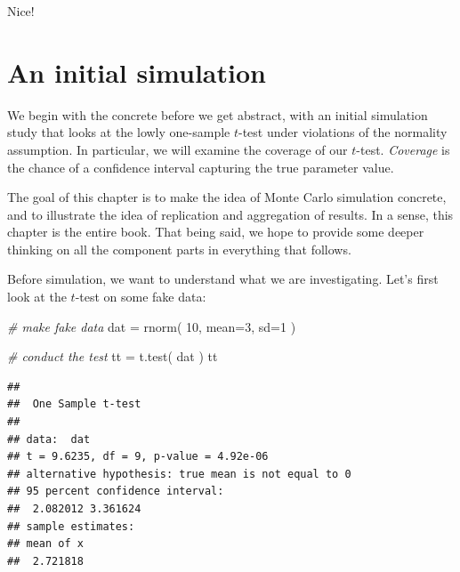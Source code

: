 \documentclass[
]{book}
\newenvironment{Shaded}{\begin{snugshade}}{\end{snugshade}}
\newcommand{\AttributeTok}[1]{\textcolor[rgb]{0.77,0.63,0.00}{#1}}
\newcommand{\CommentTok}[1]{\textcolor[rgb]{0.56,0.35,0.01}{\textit{#1}}}
\newcommand{\DecValTok}[1]{\textcolor[rgb]{0.00,0.00,0.81}{#1}}
\newcommand{\FunctionTok}[1]{\textcolor[rgb]{0.00,0.00,0.00}{#1}}
\newcommand{\NormalTok}[1]{#1}
\newcommand{\OtherTok}[1]{\textcolor[rgb]{0.56,0.35,0.01}{#1}}
\newcommand{\SpecialCharTok}[1]{\textcolor[rgb]{0.00,0.00,0.00}{#1}}
\begin{document}
Nice!

\hypertarget{an-initial-simulation}{%
\chapter{An initial simulation}\label{an-initial-simulation}}

We begin with the concrete before we get abstract, with an initial simulation study that looks at the lowly
one-sample \(t\)-test under violations of the normality assumption.
In particular, we will examine the coverage of our \(t\)-test.
\emph{Coverage} is the chance of a confidence interval capturing the true parameter value.

The goal of this chapter is to make the idea of Monte Carlo simulation concrete, and to illustrate the idea of replication
and aggregation of results.
In a sense, this chapter is the entire book.
That being said, we hope to provide some deeper thinking on all the component parts in everything that follows.

Before simulation, we want to understand what we are investigating.
Let's first look at the \(t\)-test on some fake data:

\begin{Shaded}
\begin{Highlighting}[]
\CommentTok{\# make fake data}
\NormalTok{dat }\OtherTok{=} \FunctionTok{rnorm}\NormalTok{( }\DecValTok{10}\NormalTok{, }\AttributeTok{mean=}\DecValTok{3}\NormalTok{, }\AttributeTok{sd=}\DecValTok{1}\NormalTok{ )}

\CommentTok{\# conduct the test}
\NormalTok{tt }\OtherTok{=} \FunctionTok{t.test}\NormalTok{( dat )}
\NormalTok{tt}
\end{Highlighting}
\end{Shaded}

\begin{verbatim}
## 
##  One Sample t-test
## 
## data:  dat
## t = 9.6235, df = 9, p-value = 4.92e-06
## alternative hypothesis: true mean is not equal to 0
## 95 percent confidence interval:
##  2.082012 3.361624
## sample estimates:
## mean of x 
##  2.721818
\end{verbatim}

\begin{Shaded}
\end{Shaded}
\end{document}
